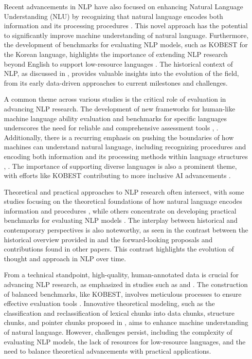 \documentclass[conference]{IEEEtran}
\begin{document}
Recent advancements in NLP have also focused on enhancing Natural Language Understanding (NLU) by recognizing that natural language encodes both information and its processing procedures \cite{b4}. This novel approach has the potential to significantly improve machine understanding of natural language. Furthermore, the development of benchmarks for evaluating NLP models, such as KOBEST for the Korean language, highlights the importance of extending NLP research beyond English to support low-resource languages \cite{b5}. The historical context of NLP, as discussed in \cite{b6}, provides valuable insights into the evolution of the field, from its early data-driven approaches to current milestones and challenges.

A common theme across various studies is the critical role of evaluation in advancing NLP research. The development of new frameworks for human-like machine language ability evaluation and benchmarks for specific languages underscores the need for reliable and comprehensive assessment tools \cite{b2}, \cite{b5}. Additionally, there is a recurring emphasis on pushing the boundaries of how machines can understand natural language, including recognizing procedures and encoding both information and its processing methods within language structures \cite{b3}, \cite{b4}. The importance of supporting diverse languages is also a prominent theme, with efforts like KOBEST contributing to more inclusive AI advancements \cite{b5}.

Theoretical and practical approaches to NLP research often intersect, with some studies focusing on the theoretical foundations of how natural language encodes information and procedures \cite{b4}, while others concentrate on developing practical benchmarks for evaluating NLP models \cite{b5}. The interplay between historical and contemporary perspectives is also noteworthy, as seen in the contrast between the historical overview provided in \cite{b6} and the forward-looking proposals and contributions found in other papers. This contrast highlights the evolution of thought and approach in NLP over time.

From a technical standpoint, high-quality, human-annotated data is crucial for advancing NLP research, as emphasized in studies such as \cite{b3} and \cite{b5}. The construction of balanced benchmarks, like KOBEST, involves meticulous processes to ensure effective evaluation tools \cite{b5}. Innovative theoretical modeling, such as the classification and reclassification of lexical chunks into data chunks, structure chunks, and pointer chunks proposed in \cite{b4}, aims to enhance machine understanding of natural language. However, challenges persist, including the complexity of evaluating NLP models, the lack of resources for low-resource languages, and the need to balance theoretical advancements with practical applications.
\end{document}
